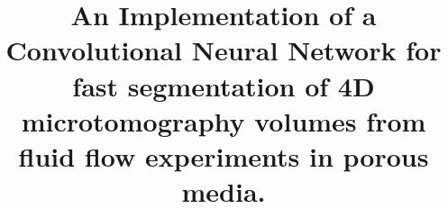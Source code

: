 \documentclass[draft,linenumbers]{agujournal2018}
\begin{document}
%
%


\title{An Implementation of a Convolutional Neural Network for fast segmentation of 4D microtomography volumes from fluid flow experiments in porous media.}

%
%











\end{document}
